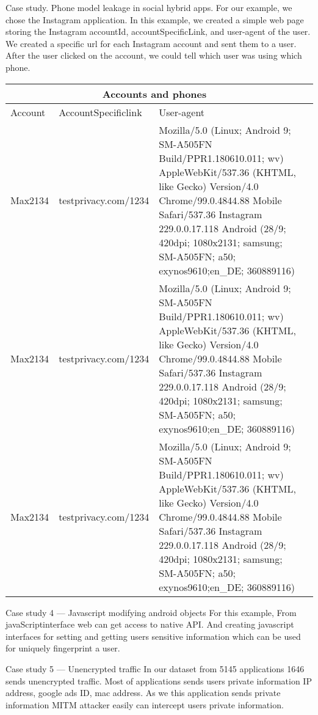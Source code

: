 Case study. Phone model leakage in social hybrid apps.
For our example, we chose the Instagram application. In this example, we created a simple web page storing the Instagram accountId, accountSpecificLink, and user-agent of the user.
 We created a specific url for each Instagram account and sent them to a user. After the user clicked on the account, we could tell which user was using which phone. \\
 \begin{tabular}{ |p{5cm}|p{5cm}|p{5cm}|p{5cm} |}
 \hline
 \multicolumn{3}{|c|}{Accounts and phones} \\
 \hline
Account & AccountSpecificlink & User-agent\\
 \hline
Max2134 & testprivacy.com/1234  & Mozilla/5.0 (Linux; Android 9; SM-A505FN Build/PPR1.180610.011; wv) AppleWebKit/537.36 (KHTML, like Gecko) Version/4.0  Chrome/99.0.4844.88 Mobile Safari/537.36 Instagram 229.0.0.17.118  Android (28/9; 420dpi; 1080x2131;           samsung; SM-A505FN; a50; exynos9610;en\_DE; 360889116) \\ 
 \hline
Max2134 & testprivacy.com/1234  & Mozilla/5.0 (Linux; Android 9; SM-A505FN Build/PPR1.180610.011; wv) AppleWebKit/537.36 (KHTML, like Gecko) Version/4.0  Chrome/99.0.4844.88 Mobile Safari/537.36 Instagram 229.0.0.17.118  Android (28/9; 420dpi; 1080x2131;           samsung; SM-A505FN; a50; exynos9610;en\_DE; 360889116) \\ 
\hline
 \hline
Max2134 & testprivacy.com/1234  & Mozilla/5.0 (Linux; Android 9; SM-A505FN Build/PPR1.180610.011; wv) AppleWebKit/537.36 (KHTML, like Gecko) Version/4.0  Chrome/99.0.4844.88 Mobile Safari/537.36 Instagram 229.0.0.17.118  Android (28/9; 420dpi; 1080x2131;           samsung; SM-A505FN; a50; exynos9610;en\_DE; 360889116) \\ 
 \hline
\end{tabular}
 
 Case study 4 — Javascript modifying android objects
 For this example, From javaScriptinterface web can get access to native API. And creating javascript interfaces for setting and getting users sensitive information which can be used for uniquely fingerprint a user. 
 
 Case study 5 — Unencrypted traffic
 In our dataset from 5145 applications 1646 sends unencrypted traffic. Most of applications sends users private information  IP address, google ads ID, mac address. As we this application sends private information MITM attacker easily can intercept users private information.  

 